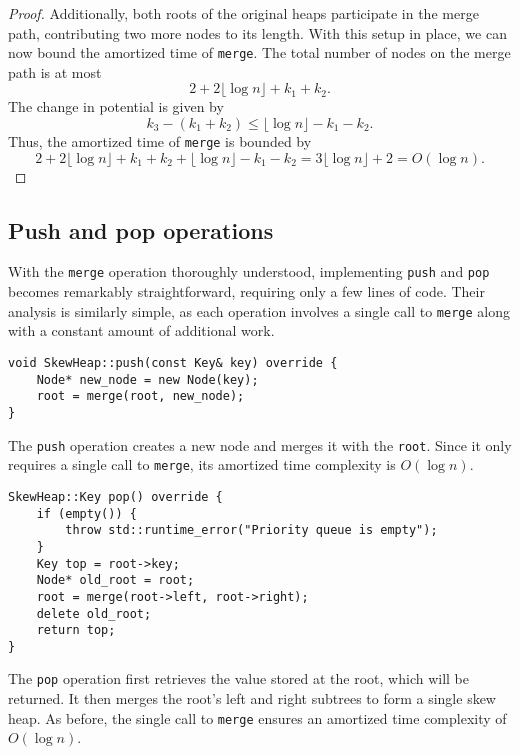 \begin{proof}
Additionally, both roots of the original heaps participate in the merge path, contributing two more nodes to its length. With this setup in place, we can now bound the amortized time of \texttt{merge}. The total number of nodes on the merge path is at most
\[
2 + 2 \lfloor \log n \rfloor + k_1 + k_2.
\]
The change in potential is given by 
\[
k_3 - (k_1 + k_2) \leq \lfloor \log n \rfloor - k_1 - k_2.
\]
Thus, the amortized time of \texttt{merge} is bounded by 
\[
2 + 2 \lfloor \log n \rfloor + k_1 + k_2 + \lfloor \log n \rfloor - k_1 - k_2 = 3\lfloor \log n \rfloor + 2 = O(\log n).
\]
\end{proof}

\subsection{Push and pop operations}

With the \texttt{merge} operation thoroughly understood, implementing \texttt{push} and \texttt{pop} becomes remarkably straightforward, requiring only a few lines of code. Their analysis is similarly simple, as each operation involves a single call to \texttt{merge} along with a constant amount of additional work.

\begin{verbatim}
void SkewHeap::push(const Key& key) override {
    Node* new_node = new Node(key);
    root = merge(root, new_node);
}
\end{verbatim}

The \texttt{push} operation creates a new node and merges it with the \texttt{root}. Since it only requires a single call to \texttt{merge}, its amortized time complexity is \(O(\log n)\).

\begin{verbatim}
SkewHeap::Key pop() override {
    if (empty()) {
        throw std::runtime_error("Priority queue is empty");
    }
    Key top = root->key;
    Node* old_root = root;
    root = merge(root->left, root->right);
    delete old_root;
    return top;
}
\end{verbatim}

The \texttt{pop} operation first retrieves the value stored at the root, which will be returned. It then merges the root’s left and right subtrees to form a single skew heap. As before, the single call to \texttt{merge} ensures an amortized time complexity of \(O(\log n)\).
